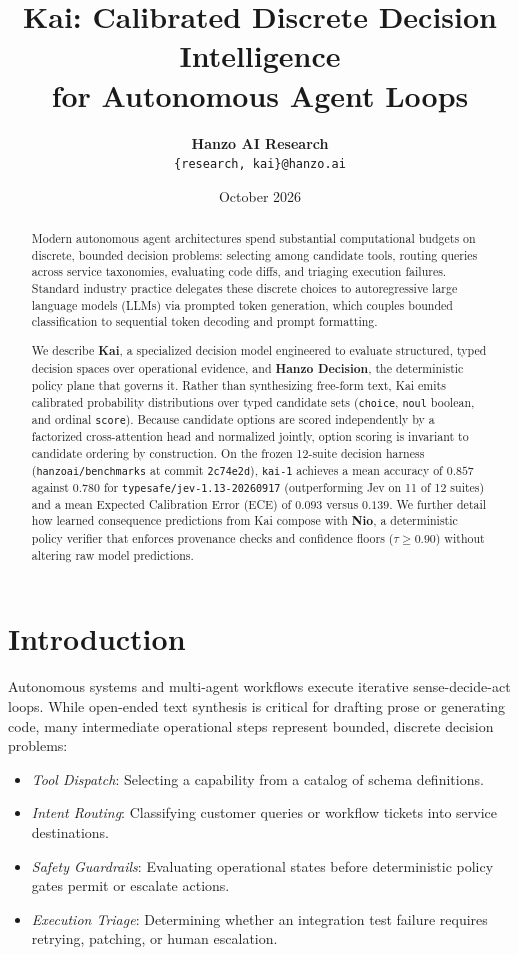 \documentclass[11pt,a4paper]{article}
\title{\textbf{Kai: Calibrated Discrete Decision Intelligence\\for Autonomous Agent Loops}}
\author{
  \textbf{Hanzo AI Research}\\
  \texttt{\{research, kai\}@hanzo.ai}
}
\date{October 2026}
\begin{document}
\maketitle

\begin{abstract}
Modern autonomous agent architectures spend substantial computational budgets on discrete, bounded decision problems: selecting among candidate tools, routing queries across service taxonomies, evaluating code diffs, and triaging execution failures. Standard industry practice delegates these discrete choices to autoregressive large language models (LLMs) via prompted token generation, which couples bounded classification to sequential token decoding and prompt formatting.

We describe \textbf{Kai}, a specialized decision model engineered to evaluate structured, typed decision spaces over operational evidence, and \textbf{Hanzo Decision}, the deterministic policy plane that governs it. Rather than synthesizing free-form text, Kai emits calibrated probability distributions over typed candidate sets (\texttt{choice}, \texttt{noul} boolean, and ordinal \texttt{score}). Because candidate options are scored independently by a factorized cross-attention head and normalized jointly, option scoring is invariant to candidate ordering by construction. On the frozen 12-suite decision harness (\texttt{hanzoai/benchmarks} at commit \texttt{2c74e2d}), \texttt{kai-1} achieves a mean accuracy of $0.857$ against $0.780$ for \texttt{typesafe/jev-1.13-20260917} (outperforming Jev on 11 of 12 suites) and a mean Expected Calibration Error (ECE) of $0.093$ versus $0.139$. We further detail how learned consequence predictions from Kai compose with \textbf{Nio}, a deterministic policy verifier that enforces provenance checks and confidence floors ($\tau \ge 0.90$) without altering raw model predictions.
\end{abstract}

\section{Introduction}

Autonomous systems and multi-agent workflows execute iterative sense-decide-act loops. While open-ended text synthesis is critical for drafting prose or generating code, many intermediate operational steps represent bounded, discrete decision problems:
\begin{itemize}
    \item \textit{Tool Dispatch}: Selecting a capability from a catalog of schema definitions.
    \item \textit{Intent Routing}: Classifying customer queries or workflow tickets into service destinations.
    \item \textit{Safety Guardrails}: Evaluating operational states before deterministic policy gates permit or escalate actions.
    \item \textit{Execution Triage}: Determining whether an integration test failure requires retrying, patching, or human escalation.
\end{itemize}
\end{document}
